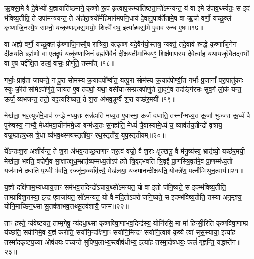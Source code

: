 ऋ॒क्सा॒मे वै दे॒वेभ्यो॑ य॒ज्ञायाति॑ष्ठमाने॒ कृष्णो॑ रू॒पं कृ॒त्वाप॒क्रम्या॑तिष्ठता॒न्ते॑\-ऽमन्यन्त॒ यं वा इ॒मे उ॑पाव॒र्थ्स्यतः॒ स इ॒दं भ॑विष्य॒तीति॒ ते उपा॑मन्त्रयन्त॒ ते अ॑होरा॒त्रयो᳚र्महि॒मान॑मपनि॒धाय॑ दे॒वानु॒पाव॑र्तेतामे॒ष वा ऋ॒चो वर्णो॒ यच्छु॒क्लं कृ॑ष्णाजि॒नस्यै॒ष साम्नो॒ यत्कृ॒ष्णमृ॑क्सा॒मयोः॒ शिल्पे᳚ स्थ॒ इत्या॑हर्क्सा॒मे ए॒वाव॑ रुन्ध ए॒षः॥१७॥

वा अह्नो॒ वर्णो॒ यच्छु॒क्लं कृ॑ष्णाजि॒नस्यै॒ष रात्रि॑या॒ यत्कृ॒ष्णं यदे॒वैन॑यो॒स्तत्र॒ न्य॑क्तं॒ तदे॒वाव॑ रुन्द्धे कृष्णाजि॒नेन॑ दीक्षयति॒ ब्रह्म॑णो॒ वा ए॒तद्रू॒पं यत्कृ॑ष्णाजि॒नं ब्रह्म॑णै॒वैनं॑ दीक्षयती॒मान्धिय॒ꣳ॒ शिक्ष॑माणस्य दे॒वेत्या॑ह यथाय॒जुरे॒वैतद्गर्भो॒ वा ए॒ष यद्दी᳚क्षि॒त उल्बं॒ वासः॒ प्रोर्णु॑ते॒ तस्मा᳚त्॥१८॥

गर्भाः॒ प्रावृ॑ता जायन्ते॒ न पु॒रा सोम॑स्य क्र॒यादपो᳚र्ण्वीत॒ यत्पु॒रा सोम॑स्य क्र॒याद॑पोर्ण्वी॒त गर्भाः᳚ प्र॒जानां᳚ परा॒पातु॑काः स्युः क्री॒ते सोमे\-ऽपो᳚र्णुते॒ जाय॑त ए॒व तदथो॒ यथा॒ वसी॑याꣳसम्प्रत्यपोर्णु॒ते ता॒दृगे॒व तदङ्गि॑रसः सुव॒र्गं लो॒कं यन्त॒ ऊर्जं॒ व्य॑भजन्त॒ ततो॒ यद॒त्यशि॑ष्यत॒ ते श॒रा अ॑भव॒न्नूर्ग्वै श॒रा यच्छ॑र॒मयी᳚॥१९॥

मेख॑ला॒ भव॒त्यूर्ज॑मे॒वाव॑ रुन्द्धे मध्य॒तः सन्न॑ह्यति मध्य॒त ए॒वास्मा॒ ऊर्जं॑ दधाति॒ तस्मा᳚न्मध्य॒त ऊ॒र्जा भु॑ञ्जत ऊ॒र्ध्वं वै पुरु॑षस्य॒ नाभ्यै॒ मेध्य॑मवा॒चीन॑ममे॒ध्यं यन्म॑ध्य॒तः सं॒नह्य॑ति॒ मेध्यं॑ चै॒वास्या॑मे॒ध्यं च॒ व्याव॑र्तय॒तीन्द्रो॑ वृ॒त्राय॒ वज्र॒म्प्राह॑र॒थ्स त्रे॒धा व्य॑भव॒थ्स्फ्यस्तृती॑य॒ꣳ॒ रथ॒स्तृती॑यं॒ यूप॒स्तृती॑यम्॥२०॥

ये᳚\-ऽन्तःश॒रा अशी᳚र्यन्त॒ ते श॒रा अ॑भव॒न्तच्छ॒राणाꣳ॑ शर॒त्वं वज्रो॒ वै श॒राः क्षुत्खलु॒ वै म॑नु॒ष्य॑स्य॒ भ्रातृ॑व्यो॒ यच्छ॑र॒मयी॒ मेख॑ला॒ भव॑ति॒ वज्रे॑णै॒व सा॒क्षात्क्षुध॒म्भ्रातृ॑व्यम्मध्य॒तो\-ऽप॑ हते त्रि॒वृद्भ॑वति त्रि॒वृद्वै प्रा॒णस्त्रि॒वृत॑मे॒व प्रा॒णम्म॑ध्य॒तो यज॑माने दधाति पृ॒थ्वी भ॑वति॒ रज्जू॑ना॒व्व्याँवृ॑त्त्यै॒ मेख॑लया॒ यज॑मानन्दीक्षयति॒ योक्त्रे॑ण॒ पत्नी᳚म्मिथुन॒त्वाय॑॥२१॥

य॒ज्ञो दक्षि॑णाम॒भ्य॑ध्याय॒त्ताꣳ सम॑भव॒त्तदिन्द्रो॑\-ऽचाय॒थ्सो॑\-ऽमन्यत॒ यो वा इ॒तो ज॑नि॒ष्यते॒ स इ॒दम्भ॑विष्य॒तीति॒ ताम्प्रावि॑श॒त्तस्या॒ इन्द्र॑ ए॒वाजा॑यत॒ सो॑\-ऽमन्यत॒ यो वै मदि॒तो\-ऽप॑रो जनि॒ष्यते॒ स इ॒दम्भ॑विष्य॒तीति॒ तस्या॑ अनु॒मृश्य॒ योनि॒माच्छि॑न॒थ्सा सू॒तव॑शाभव॒त्तथ्सू॒तव॑शायै॒ जन्म॑॥२२॥

ताꣳ हस्ते॒ न्य॑वेष्टयत॒ ताम्मृ॒गेषु॒ न्य॑दधा॒थ्सा कृ॑ष्णविषा॒णाभ॑व॒दिन्द्र॑स्य॒ योनि॑रसि॒ मा मा॑ हिꣳसी॒रिति॑ कृष्णविषा॒णाम्प्र य॑च्छति॒ सयो॑निमे॒व य॒ज्ञं क॑रोति॒ सयो॑नि॒न्दक्षि॑णा॒ꣳ॒ सयो॑नि॒मिन्द्रꣳ॑ सयोनि॒त्वाय॑ कृ॒ष्यै त्वा॑ सुस॒स्याया॒ इत्या॑ह॒ तस्मा॑दकृष्टप॒च्या ओष॑धयः पच्यन्ते सुपिप्प॒लाभ्य॒स्त्वौष॑धीभ्य॒ इत्या॑ह॒ तस्मा॒दोष॑धयः॒ फलं॑ गृह्णन्ति॒ यद्धस्ते॑न॥२३॥

